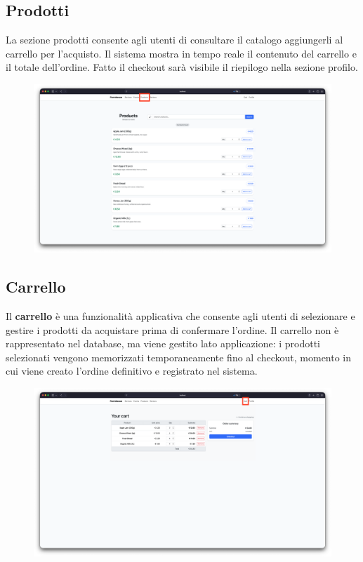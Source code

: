 \documentclass[a4paper,12pt]{report}
\begin{document}
\subsection*{Prodotti}
La sezione prodotti consente agli utenti di consultare il catalogo aggiungerli al carrello per 
l'acquisto. Il sistema mostra in tempo reale il contenuto del carrello e il totale dell'ordine. 
Fatto il checkout sarà visibile il riepilogo nella sezione profilo.

\begin{figure}[H]
    \centering
    \includegraphics[width=\textwidth, trim=0 0 0 0]{./img/users/products.png}
    \vspace{-1em}
    \label{fig:products}
\end{figure}

\subsection*{Carrello}
Il \textbf{carrello} è una funzionalità applicativa che consente agli utenti di selezionare e 
gestire i prodotti da acquistare prima di confermare l'ordine. Il carrello non è rappresentato 
nel database, ma viene gestito lato applicazione: i prodotti selezionati vengono memorizzati 
temporaneamente fino al checkout, momento in cui viene creato l'ordine definitivo e 
registrato nel sistema.

\begin{figure}[H]
    \centering
    \includegraphics[width=\textwidth, trim=0 0 0 0]{./img/users/cart.png}
    \vspace{-1em}
    \label{fig:cart}
\end{figure}
\end{document}
